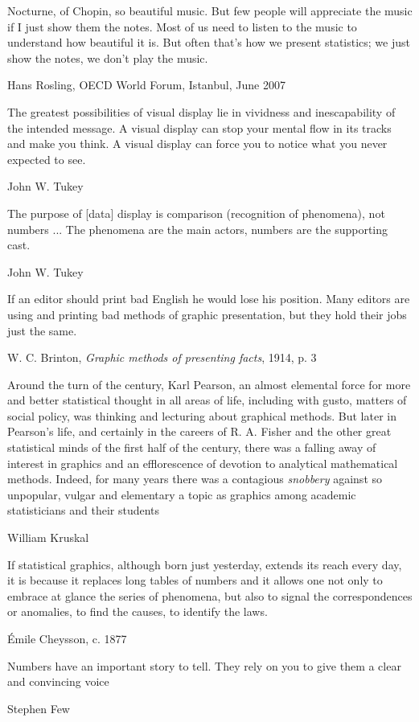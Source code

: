 \epigraph{Nocturne, of Chopin, so beautiful music. But few people will appreciate the music if I just show them the notes. Most of us need to listen to the music to understand how beautiful it is. But often that's how we present statistics; we just show the notes, we don't play the music.}{Hans Rosling, OECD World Forum, Istanbul, June 2007}

\epigraph{The greatest possibilities of visual display lie in vividness and inescapability of the intended message. A visual display can stop your mental flow in its tracks and make you think. A visual display can force you to notice what you never expected to see.}{John W. Tukey \citeyear{Tukey:90}}

\epigraph{The purpose of [data] display is comparison (recognition of phenomena), not numbers ... The phenomena are the main actors, numbers are the supporting cast.}{John W. Tukey \citeyear{Tukey:90}}

\epigraph{If an editor should print bad English he would lose his position. Many editors are using and printing bad methods of graphic presentation, but they hold their jobs just the same.}{W. C. Brinton, \emph{Graphic methods of presenting facts}, 1914, p. 3}

\epigraph{Around the turn of the century, Karl Pearson, an almost elemental force for more and better statistical thought in all areas of life, including with gusto, matters of social policy, was thinking and lecturing about graphical methods. But later in Pearson's life, and certainly in the careers of R. A. Fisher and the other great statistical minds of the first half of the century, there was a falling away of interest in graphics and an efflorescence  of devotion to analytical mathematical methods. Indeed, for many years there was a contagious \emph{snobbery} against so unpopular, vulgar and elementary a topic as graphics among academic statisticians and their students}{William Kruskal \citep[p. 144, italics in original]{Kruskal:1978}}




\epigraph{If statistical graphics, although born just yesterday, extends its reach every day, it is because it replaces long tables of numbers and it allows one not only to embrace at glance the series of phenomena, but also to signal the correspondences or anomalies, to find the causes, to identify the laws.}{\'Emile Cheysson, c. 1877}

\epigraph{Numbers have an important story to tell. They rely on you to give them a clear and convincing voice}{Stephen Few}

